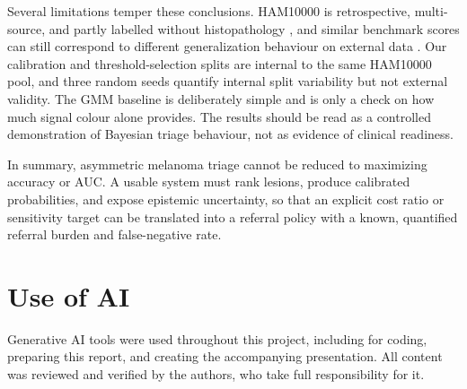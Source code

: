 \documentclass[10pt,a4paper]{article}
\begin{document}
Several limitations temper these conclusions. HAM10000 is retrospective, multi-source, and partly labelled without histopathology \citep{tschandl2018ham10000}, and similar benchmark scores can still correspond to different generalization behaviour on external data \citep{codella2018skin}. Our calibration and threshold-selection splits are internal to the same HAM10000 pool, and three random seeds quantify internal split variability but not external validity. The GMM baseline is deliberately simple and is only a check on how much signal colour alone provides. The results should be read as a controlled demonstration of Bayesian triage behaviour, not as evidence of clinical readiness.

In summary, asymmetric melanoma triage cannot be reduced to maximizing accuracy or AUC. A usable system must rank lesions, produce calibrated probabilities, and expose epistemic uncertainty, so that an explicit cost ratio or sensitivity target can be translated into a referral policy with a known, quantified referral burden and false-negative rate.

\appendix
\makeatletter
\renewcommand\@seccntformat[1]{\color{headingcolor}\csname the#1\endcsname\quad}
\makeatother
\section{\texorpdfstring{\color{headingcolor}Use of AI}{Use of AI}}
\color{headingcolor}
Generative AI tools were used throughout this project, including for coding, preparing this report, and creating the accompanying presentation. All content was reviewed and verified by the authors, who take full responsibility for it.
\color{black}



\end{document}
